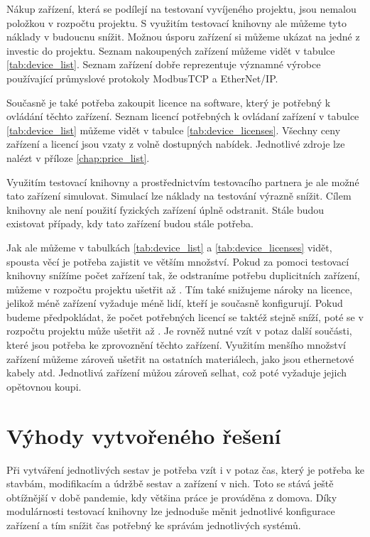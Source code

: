 Nákup zařízení, která se podílejí na testovaní vyvíjeného projektu, jsou nemalou položkou v rozpočtu projektu. S využitím testovací knihovny ale můžeme tyto náklady v budoucnu snížit. Možnou úsporu zařízení si můžeme ukázat na jedné z investic do projektu. Seznam nakoupených zařízení můžeme vidět v tabulce \ref{tab:device_list}. Seznam zařízení dobře reprezentuje významné výrobce používající průmyslové protokoly ModbusTCP a EtherNet/IP.

Současně je také potřeba zakoupit licence na software, který je potřebný k ovládání těchto zařízení. Seznam licencí potřebných k ovládaní zařízení v tabulce \ref{tab:device_list} můžeme vidět v tabulce \ref{tab:device_licenses}. Všechny ceny zařízení a licencí jsou vzaty z volně dostupných nabídek. Jednotlivé zdroje lze nalézt v příloze \ref{chap:price_list}.

Využitím testovací knihovny a prostřednictvím testovacího partnera je ale možné tato zařízení simulovat. Simulací lze náklady na testování výrazně snížit. Cílem knihovny ale není použití fyzických zařízení úplně odstranit. Stále budou existovat případy, kdy tato zařízení budou stále potřeba. 

Jak ale můžeme v tabulkách \ref{tab:device_list} a \ref{tab:device_licenses} vidět, spousta věcí je potřeba zajistit ve větším množství. Pokud za pomoci testovací knihovny snížíme počet zařízení tak, že odstraníme potřebu duplicitních zařízení, můžeme v rozpočtu projektu ušetřit až . Tím také snižujeme nároky na licence, jelikož méně zařízení vyžaduje méně lidí, kteří je současně konfigurují. Pokud budeme předpokládat, že počet potřebných licencí se taktéž stejně sníží, poté se v rozpočtu projektu může ušetřit až .
Je rovněž nutné vzít v potaz další součásti, které jsou potřeba ke zprovoznění těchto zařízení. Využitím menšího množství zařízení můžeme zároveň ušetřit na ostatních materiálech, jako jsou ethernetové kabely atd. Jednotlivá zařízení můžou zároveň selhat, což poté vyžaduje jejich opětovnou koupi.

\section{Výhody vytvořeného řešení}
Při vytváření jednotlivých sestav je potřeba vzít i v potaz čas, který je potřeba ke stavbám, modifikacím a údržbě sestav a zařízení v nich. Toto se stává ještě obtížnější v době pandemie, kdy většina práce je prováděna z domova. Díky modulárnosti testovací knihovny lze jednoduše měnit jednotlivé konfigurace zařízení a tím snížit čas potřebný ke správám jednotlivých systémů. 

